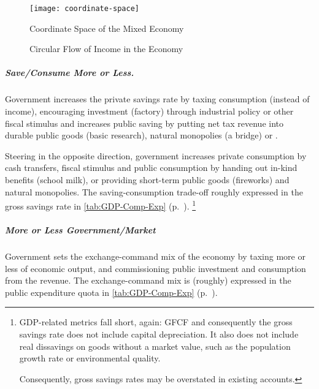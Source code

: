 \begin{landscape}
 \begin{figure}[htbp]
	\centering
	\texttt{[image: coordinate-space]}
	\caption{Coordinate Space of the Mixed Economy}
	\label{fig:coordinate-space}
\end{figure} %
\end{landscape}

\begin{figure}[htbp]
	\centering
	\caption[Circular Flow in the Economy]{Circular Flow of Income in the Economy}
	\label{fig:circular-flow}
\end{figure}

\subparagraph[Save More or Less]{Save/Consume More or Less.} Government increases the private savings rate by taxing consumption (instead of income), encouraging investment (factory) through industrial policy or other fiscal stimulus and increases public saving by putting net tax revenue into durable public goods (basic research), natural monopolies (a bridge) or .

Steering in the opposite direction, government increases private consumption by cash transfers, fiscal stimulus and public consumption by handing out in-kind benefits (school milk), or providing short-term public goods (fireworks) and natural monopolies.
The saving-consumption trade-off roughly expressed in the gross savings rate in \autoref{tab:GDP-Comp-Exp} (p.~\pageref{tab:GDP-Comp-Exp}).
\footnote{
	GDP-related metrics fall short, again:
	\gls{GFCF} and consequently the gross savings rate does not include capital depreciation.
	It also does not include real dissavings on goods without a market value, such as the population growth rate or environmental quality.

	Consequently, gross savings rates may be overstated in existing accounts.
}


\subparagraph[Exchange-Command Mix]{More or Less Government/Market} Government sets the exchange-command mix of the economy by taxing more or less of economic output, and commissioning public investment and consumption from the revenue.
The exchange-command mix is (roughly) expressed in the public expenditure quota in \autoref{tab:GDP-Comp-Exp} (p.~\pageref{tab:GDP-Comp-Exp}).

